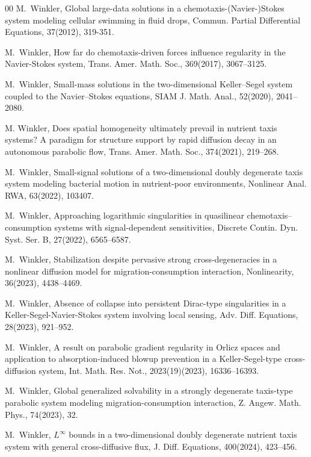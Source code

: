 \documentclass[12pt]{article}
\theoremstyle{plain}
\theoremstyle{definition}
\numberwithin{equation}{section}
\begin{document}
\begin{thebibliography}{00}
M.~Winkler,
 Global large-data solutions in a chemotaxis-(Navier-)Stokes system modeling cellular swimming in fluid drops, Commun. Partial Differential Equations, 37(2012), 319-351.

M.~Winkler,
 How far do chemotaxis-driven forces influence regularity in the Navier-Stokes system, Trans. Amer. Math. Soc., 369(2017), 3067--3125.

M.~Winkler,
 Small-mass solutions in the two-dimensional Keller--Segel system coupled to the Navier--Stokes equations, SIAM J. Math. Anal.,  52(2020), 2041--2080.

M. Winkler, Does spatial homogeneity ultimately prevail in nutrient taxis systems? A paradigm for
structure support by rapid diffusion decay in an autonomous parabolic flow,  Trans. Amer. Math. Soc., 374(2021),
219--268.

 M.~Winkler,
 Small-signal solutions of a two-dimensional doubly degenerate taxis system modeling bacterial motion in
nutrient-poor environments, Nonlinear Anal. RWA, 63(2022), 103407.

M.~Winkler,
 Approaching logarithmic singularities in quasilinear chemotaxis--consumption systems with
 signal-dependent sensitivities, Discrete Contin. Dyn. Syst. Ser. B, 27(2022), 6565--6587.

 M.~Winkler,
Stabilization despite pervasive strong cross-degeneracies in a nonlinear
diffusion model for migration-consumption interaction, Nonlinearity, 36(2023), 4438--4469.

 M.~Winkler,
Absence of collapse into persistent Dirac-type singularities in a Keller-Segel-Navier-Stokes system involving local sensing,
Adv. Diff. Equations, 28(2023), 921--952.

 M.~Winkler,
   A result on parabolic gradient regularity in Orlicz spaces and application to absorption-induced blowup prevention in a Keller-Segel-type cross-diffusion system, Int. Math. Res. Not., 2023(19)(2023), 16336--16393.

M.~Winkler, Global generalized solvability in a strongly degenerate taxis-type parabolic system modeling
migration-consumption interaction, Z. Angew. Math. Phys., 74(2023), 32.

M.~Winkler, $L^\infty$ bounds in a two-dimensional doubly degenerate nutrient taxis system with general cross-diffusive flux, J. Diff. Equations, 400(2024), 423--456.


\end{thebibliography}
\end{document}
